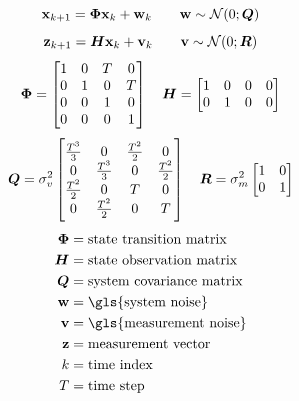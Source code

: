 \begin{equation}\label{eq:motion_model}
\boldsymbol{\mathbf{x}}_{k+1} = \bm{\Phi} \boldsymbol{\mathbf{x}}_k + \boldsymbol{\mathbf{w}}_k \qquad \boldsymbol{\mathbf{w}} \sim \mathcal{N}(0;\bm{Q})
\end{equation}
\begin{equation}\label{eq:measurement_model}
\boldsymbol{\mathbf{z}}_{k+1} = \bm{H}\boldsymbol{\mathbf{x}}_k + \boldsymbol{\mathbf{v}}_k \qquad \boldsymbol{\mathbf{v}} \sim \mathcal{N}(0;\bm{R})
\end{equation}
\begin{equation}\label{eq:model_matrices}
\bm{\Phi} =	\begin{bmatrix}
1 & 0 & T & 0 \\
0 & 1 & 0 & T \\
0 & 0 & 1 & 0 \\
0 & 0 & 0 & 1 \\
\end{bmatrix}
\quad
\bm{H} =	\begin{bmatrix}
1 & 0 & 0 & 0 \\
0 & 1 & 0 & 0 \\
\end{bmatrix}
\end{equation}
\begin{equation}\label{eq:noise_matrices}
\bm{Q}	= \sigma_v^2 \begin{bmatrix}
\frac{T^3}{3} 	& 0 				& \frac{T^2}{2}	& 0 			\\
0 				& \frac{T^3}{3}  	& 0 			& \frac{T^2}{2}	\\
\frac{T^2}{2}	& 0					& T				& 0				\\
0				& \frac{T^2}{2}		& 0				& T				\\
\end{bmatrix}
\quad
\bm{R} =	\sigma_m^2 
\begin{bmatrix}
1 & 0 \\
0 & 1 \\
\end{bmatrix}
\end{equation}
\begin{equation*}
\begin{split}
\M{\Phi} 	&= \text{state transition matrix} \\
\M{H}		&= \text{state observation matrix} \\
\M{Q}		&= \text{system covariance matrix} \\
\V{w}		&= \text{\gls{system noise}} \\
\V{v}		&= \text{\gls{measurement noise}} \\
\V{z}		&= \text{measurement vector} \\
k 			&= \text{time index} \\
T  			&= \text{time step} \\
\end{split}
\end{equation*}

